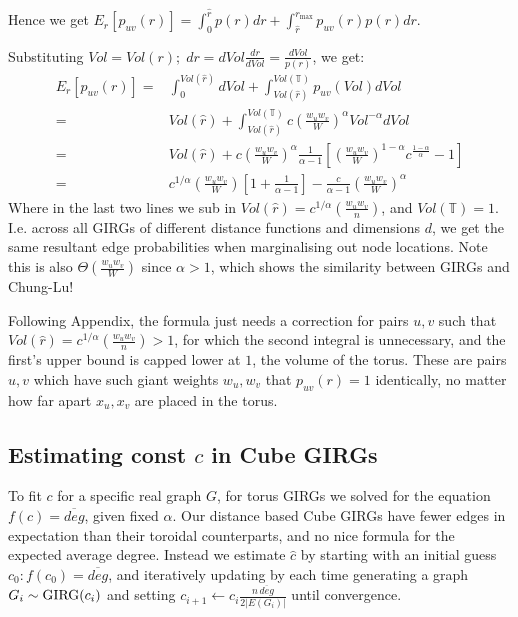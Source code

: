 Hence we get $E_r[p_{uv}(r)] = \int_0^{\hat{r}} p(r) dr + \int_{\hat{r}}^{r_{\max}} p_{uv}(r) p(r) dr$.

Substituting $Vol = Vol(r);\; dr = dVol \frac{dr}{dVol} = \frac{dVol}{p(r)}$, we get:
\begin{align}
    E_r[p_{uv}(r)] =& 
    \int_0^{Vol(\hat{r})} dVol + 
    \int_{Vol(\hat{r})}^{Vol(\mathbb{T})} p_{uv}(Vol) dVol
    \\
    =&
    Vol(\hat{r}) + 
    \int_{Vol(\hat{r})}^{Vol(\mathbb{T})} 
    c \left (\frac{w_u w_v}{W} \right )^\alpha Vol^{-\alpha}  
        dVol
    \\
    =&
    Vol(\hat{r}) + 
    c \left (\frac{w_u w_v}{W} \right )^\alpha \frac{1}{\alpha - 1}
        \left [
            \left (\frac{w_u w_v}{W} \right )^{1 - \alpha} c^{\frac{1 - \alpha}{\alpha}} - 1
        \right ]
    \\
    =&
    c^{1/\alpha} \left (\frac{w_u w_v}{W} \right ) 
        \left [ 1 + \frac{1}{\alpha - 1} \right ] 
    - 
    \frac{c}{\alpha - 1} \left (\frac{w_u w_v}{W} \right )^\alpha
    \label{eq:p_u_to_v_marginal_on_position}
\end{align}
Where in the last two lines we sub in $Vol(\hat{r}) = c^{1/\alpha} \left (\frac{w_u w_v}{n} \right )$, and $Vol(\mathbb{T}) = 1$.
I.e. across all GIRGs of different distance functions and dimensions $d$, we get the same resultant edge probabilities when marginalising out node locations. Note this is also $\Theta(\frac{w_u w_v}{W})$ since $\alpha > 1$, which shows the similarity between GIRGs and Chung-Lu!

Following \cite{blasius2022efficiently} Appendix, the formula just needs a correction for pairs $u, v$ such that $Vol(\hat{r}) = c^{1/\alpha} \left ( \frac{w_u w_v}{n} \right ) > 1$, for which the second integral is unnecessary, and the first's upper bound is capped lower at $1$, the volume of the torus. These are pairs $u, v$ which have such giant weights $w_u, w_v$ that $p_{uv}(r) = 1$ identically, no matter how far apart $x_u, x_v$ are placed in the torus.



\subsection{Estimating const $c$ in Cube GIRGs}
To fit $c$ for a specific real graph $G$, for torus GIRGs we solved for the equation $f(c) = \overline{deg}$, given fixed $\alpha$. Our distance based Cube GIRGs have fewer edges in expectation than their toroidal counterparts, and no nice formula for the expected average degree. Instead we estimate $\hat{c}$ by starting with an initial guess $c_0: f(c_0) = \overline{deg}$, and iteratively updating by each time generating a graph $G_i \sim \mathrm{GIRG}(c_i)$ and setting $c_{i+1} \gets c_i \frac{n \, \overline{deg}}{2 |E(G_i)|}$ until convergence.


